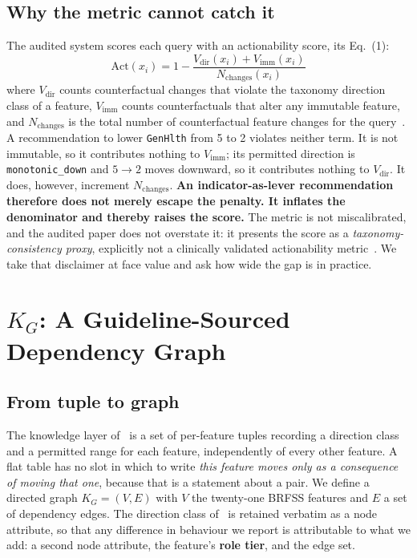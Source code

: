 \documentclass[conference]{IEEEtran}
\begin{document}
\subsection{Why the metric cannot catch it}
The audited system scores each query with an actionability score, its Eq.~(1):
\begin{equation}
\mathrm{Act}(x_i) = 1 - \frac{V_{\mathrm{dir}}(x_i) + V_{\mathrm{imm}}(x_i)}{N_{\mathrm{changes}}(x_i)}
\end{equation}
where $V_{\mathrm{dir}}$ counts counterfactual changes that violate the taxonomy direction class of a feature, $V_{\mathrm{imm}}$ counts counterfactuals that alter any immutable feature, and $N_{\mathrm{changes}}$ is the total number of counterfactual feature changes for the query~\cite{thieu2026}. A recommendation to lower \texttt{GenHlth} from 5 to 2 violates neither term. It is not immutable, so it contributes nothing to $V_{\mathrm{imm}}$; its permitted direction is \texttt{monotonic\_down} and $5\rightarrow2$ moves downward, so it contributes nothing to $V_{\mathrm{dir}}$. It does, however, increment $N_{\mathrm{changes}}$. \textbf{An indicator-as-lever recommendation therefore does not merely escape the penalty. It inflates the denominator and thereby raises the score.} The metric is not miscalibrated, and the audited paper does not overstate it: it presents the score as a \emph{taxonomy-consistency proxy}, explicitly not a clinically validated actionability metric~\cite{thieu2026}. We take that disclaimer at face value and ask how wide the gap is in practice.

\section{$K_G$: A Guideline-Sourced Dependency Graph}
\subsection{From tuple to graph}
The knowledge layer of~\cite{thieu2026} is a set of per-feature tuples recording a direction class and a permitted range for each feature, independently of every other feature. A flat table has no slot in which to write \emph{this feature moves only as a consequence of moving that one}, because that is a statement about a pair. We define a directed graph $K_G = (V, E)$ with $V$ the twenty-one BRFSS features and $E$ a set of dependency edges. The direction class of~\cite{thieu2026} is retained verbatim as a node attribute, so that any difference in behaviour we report is attributable to what we add: a second node attribute, the feature's \textbf{role tier}, and the edge set.
\end{document}
